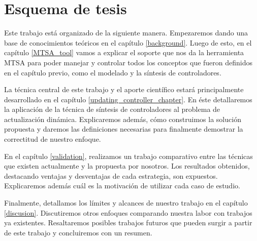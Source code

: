 \section{Esquema de tesis}

Este trabajo está organizado de la siguiente manera. Empezaremos dando una base de conocimientos teóricos en el capítulo
\ref{background}. Luego de esto, en el capítulo \ref{MTSA_tool} vamos a explicar el soporte que nos da la herramienta
MTSA para poder manejar y controlar todos los conceptos que fueron definidos en el capítulo previo, como el modelado y
la síntesis de controladores.

La técnica central de este trabajo y el aporte científico estará principalmente desarrollado en el capítulo
\ref{updating_controller_chapter}. En éste detallaremos la aplicación de la técnica de síntesis de controladores al
problema de actualización dinámica. Explicaremos además, cómo construimos la solución propuesta y daremos las
definiciones necesarias para finalmente demostrar la correctitud de nuestro enfoque.

En el capítulo \ref{validation}, realizamos un trabajo comparativo entre las técnicas que existen actualmente y la propuesta por
nosotros. Los resultados obtenidos, destacando ventajas y desventajas de cada estrategia, son expuestos. Explicaremos
además cuál es la motivación de utilizar cada caso de estudio.

Finalmente, detallamos los límites y alcances de nuestro trabajo en el capítulo \ref{discusion}. Discutiremos otros
enfoques comparando nuestra labor con trabajos ya existentes. Resaltaremos posibles trabajos futuros que pueden surgir a
partir de este trabajo y concluiremos con un resumen.
